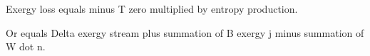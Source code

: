 Exergy loss equals minus T zero multiplied by entropy production.  

Or equals Delta exergy stream plus summation of B exergy j minus summation of W dot n.